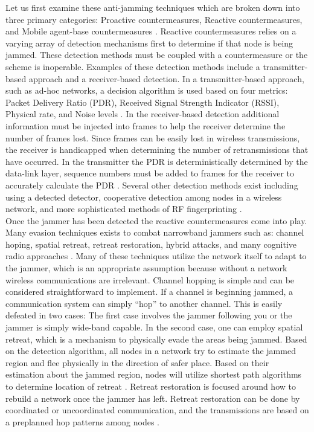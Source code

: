 Let us first examine these anti-jamming techniques which are broken down into three primary categories: Proactive countermeasures, Reactive countermeasures, and Mobile agent-base countermeasures \cite{1}.  Reactive countermeasures relies on a varying array of detection mechanisms first to determine if that node is being jammed.  These detection methods  must be coupled with a countermeasure or the scheme is inoperable.  Examples of these detection methods include a transmitter-based approach and a receiver-based detection\cite{TBD}.  In a transmitter-based approach, such as ad-hoc networks, a decision algorithm is used based on four metrics: Packet Delivery Ratio (PDR), Received Signal Strength Indicator (RSSI), Physical rate, and Noise levels \cite{3}.  In the receiver-based detection additional information must be injected into frames to help the receiver determine the number of frames lost.  Since frames can be easily lost in wireless transmissions, the receiver is handicapped when determining the number of retransmissions that have occurred.  In the transmitter the PDR is deterministically determined by the data-link layer, sequence numbers must be added to frames for the receiver to accurately calculate the PDR \cite{3}.  Several other detection methods exist including using a detected detector, cooperative detection among nodes in a wireless network, and more sophisticated methods of RF fingerprinting \cite{3}.\\

Once the jammer has been detected the reactive countermeasures come into play.  Many evasion techniques exists to combat narrowband jammers such as: channel hoping, spatial retreat, retreat restoration, hybrid attacks, and many cognitive radio approaches \cite{2}.  Many of these techniques utilize the network itself to adapt to the jammer, which is an appropriate assumption because without a network wireless communications are irrelevant.  Channel hopping is simple and can be considered straightforward to implement.  If a channel is beginning jammed, a communication system can simply ``hop'' to another channel.  This is easily defeated in two cases: The first case involves the jammer following you or the jammer is simply wide-band capable.  In the second case, one can employ spatial retreat, which is a mechanism to physically evade the areas being jammed. Based on the detection algorithm, all nodes in a network try to estimate the jammed region and flee physically in the direction of safer place. Based on their estimation about the jammed region, nodes will utilize shortest path algorithms to determine location of retreat \cite{5}.  Retreat restoration is focused around how to rebuild a network once the jammer has left.  Retreat restoration can be done by coordinated or uncoordinated communication, and the transmissions are based on a preplanned hop patterns among nodes \cite{6}.\\

